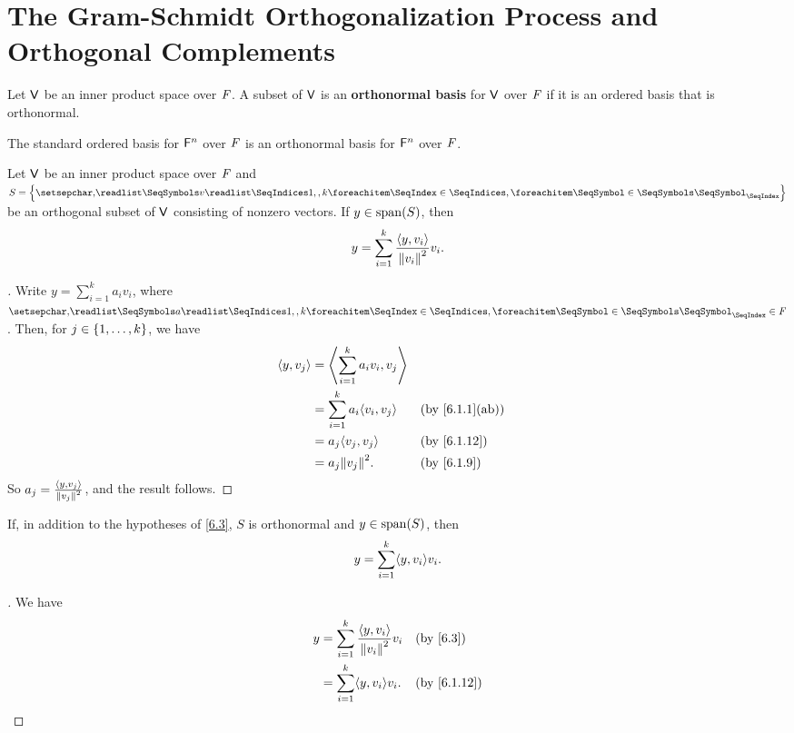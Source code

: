\section{The Gram-Schmidt Orthogonalization Process and Orthogonal Complements}\label{sec:6.2}

\begin{defn}\label{6.2.1}
	Let \(\mathsf{V}\) be an inner product space over \(\mathit{F}\).
	A subset of \(\mathsf{V}\) is an \textbf{orthonormal basis} for \(\mathsf{V}\) over \(\mathit{F}\) if it is an ordered basis that is orthonormal.
\end{defn}

\begin{eg}\label{6.2.2}
	The standard ordered basis for \(\mathsf{F}^n\) over \(\mathit{F}\) is an orthonormal basis for \(\mathsf{F}^n\) over \(\mathit{F}\).
\end{eg}

\begin{thm}\label{6.3}
	Let \(\mathsf{V}\) be an inner product space over \(\mathit{F}\) and \(S = \set{\seq{v}{1,,k}}\) be an orthogonal subset of \(\mathsf{V}\) consisting of nonzero vectors.
	If \(y \in \spn{S}\), then
	\[
		y = \sum_{i = 1}^k \frac{\left\langle y, v_i\right\rangle}{\left\lVert v_i\right\rVert^2} v_i.
	\]
\end{thm}

\begin{proof}[]
	Write \(y = \sum_{i = 1}^k a_i v_i\), where \(\seq{a}{1,,k} \in \F\).
	Then, for \(j \in \left\lbrace1, \dots, k\right\rbrace\), we have
	\begin{align*}
		\inn{y, v_j} & = \inn{\sum_{i = 1}^k a_i v_i, v_j}                     \\
		             & = \sum_{i = 1}^k a_i \inn{v_i, v_j} &  & \by{6.1.1}[ab] \\
		             & = a_j \inn{v_j, v_j}                &  & \by{6.1.12}    \\
		             & = a_j \norm{v_j}^2.                 &  & \by{6.1.9}
	\end{align*}
	So \(a_j = \frac{\left\langle y, v_j\right\rangle}{\left\lVert v_j\right\rVert^2}\), and the result follows.
\end{proof}

\begin{cor}\label{6.2.3}
	If, in addition to the hypotheses of \cref{6.3}, \(S\) is orthonormal and \(y \in \spn{S}\), then
	\[
		y = \sum_{i = 1}^k \inn{y, v_i} v_i.
	\]
\end{cor}

\begin{proof}[]
	We have
	\begin{align*}
		y & = \sum_{i = 1}^k \frac{\inn{y, v_i}}{\norm{v_i}^2} v_i &  & \by{6.3}    \\
		  & = \sum_{i = 1}^k \inn{y, v_i} v_i.                     &  & \by{6.1.12}
	\end{align*}
\end{proof}

